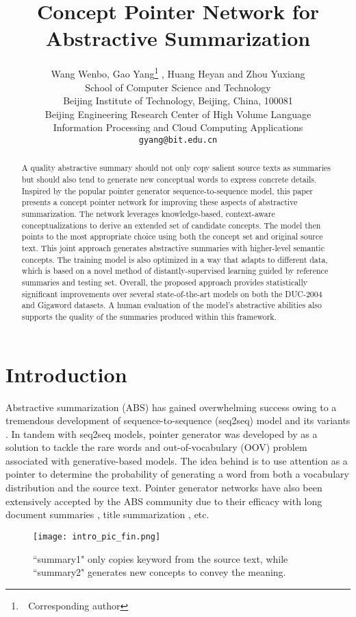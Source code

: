 \documentclass[11pt,a4paper]{article}
\title{Concept Pointer Network for Abstractive Summarization}
\author{ Wang Wenbo, Gao Yang\thanks{\,\,  Corresponding author} , Huang Heyan and Zhou Yuxiang\\
{  School of Computer Science and Technology}\\{ Beijing Institute of Technology, Beijing, China, 100081}\\
{  Beijing Engineering Research Center of High Volume Language}\\{
Information Processing and Cloud Computing Applications}\\
{\tt gyang@bit.edu.cn}\\
}
\date{}
\begin{document}
\maketitle
\begin{abstract}
  A quality abstractive summary should not only copy salient source texts as summaries but should also tend to generate new conceptual words to express concrete details. Inspired by the popular pointer generator sequence-to-sequence model, this paper presents a concept pointer network for improving these aspects of abstractive summarization. The network leverages knowledge-based, context-aware conceptualizations to derive an extended set of candidate concepts. The model then points to the most appropriate choice using both the concept set and original source text. This joint approach generates abstractive summaries with higher-level semantic concepts. The training model is also optimized in a way that adapts to different data, which is based on a novel method of distantly-supervised learning guided by reference summaries and testing set. Overall, the proposed approach provides statistically significant improvements over several state-of-the-art models on both the DUC-2004 and Gigaword datasets.  A human evaluation of the model's abstractive abilities also supports the quality of the summaries produced within this framework. 
\end{abstract}

 
 \section{Introduction}

Abstractive summarization (ABS) has gained overwhelming success owing to a tremendous development of sequence-to-sequence (seq2seq) model and its variants \cite{DBLP:conf/emnlp/RushCW15,Chopra2016Abstractive,paulus2017deep,DBLP:conf/acl/BansalPG18,Gao2019}. 
In tandem with seq2seq models, pointer generator was developed by  \citet{DBLP:conf/acl/SeeLM17} as a solution to tackle the rare words and out-of-vocabulary (OOV) problem associated with generative-based models. The idea behind is to use attention as a pointer to determine the probability of generating a word from both a vocabulary distribution and the source text. 
Pointer generator networks have also been extensively accepted by the ABS community due to their efficacy with long document summaries \cite{chen2018fast,hsu2018unified}, title summarization \cite{sun2018multi}, etc.


\begin{figure}[t]
	\centering
	\texttt{[image: intro\_pic\_fin.png]}
	\caption{``summary1" only copies keyword from the source text, while ``summary2"  generates new concepts to convey the meaning.}  
	\label{fig:intro}
\end{figure}
\end{document}
